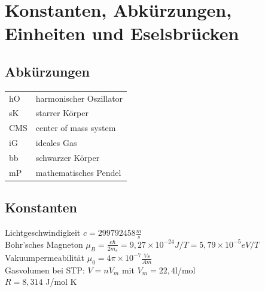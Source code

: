 \documentclass[12pt,a4paper, twoside]{article}
\renewcommand{\=}[1]{\stackrel{#1}{=}}
\theoremstyle{definition}
\theoremstyle{remark}
\begin{document}
%
%
%
%

\newpage
\section{Konstanten, Abkürzungen, Einheiten und Eselsbrücken}

\subsection{Abkürzungen}

\begin{tabular}{ll}
hO & harmonischer Oszillator\\
sK & starrer Körper\\
CMS & center of mass system\\
iG & ideales Gas\\
bb & schwarzer Körper\\
mP & mathematisches Pendel\\

\end{tabular}

\subsection{Konstanten}
Lichtgeschwindigkeit \dotfill $c = 299 792 458 \frac{m}{s}$\\
Bohr'sches Magneton \dotfill $\mu_B = \frac{e\hbar}{2m_e} = 9,27 \times 10^{-24} J/T = 5,79 \times 10^{-5} eV/T$\\
Vakuumpermeabilität \dotfill $\mu_0 = 4\pi \times 10^{-7} \frac{Vs}{Am}$\\
Gasvolumen bei STP: $V = n V_m$ mit $V_m = 22,4$l/mol\\
$R = 8,314$ J/mol K
\end{document}
